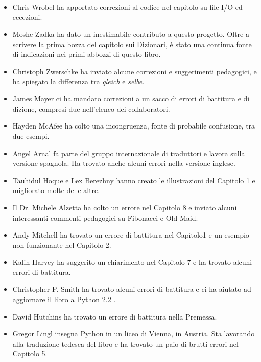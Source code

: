 \documentclass[10pt]{book}
\begin{document}
\begin{itemize}
\item Chris Wrobel ha apportato correzioni al codice nel capitolo su file I/O ed eccezioni. 

\item Moshe Zadka ha dato un inestimabile contributo a questo progetto. Oltre a scrivere la prima bozza del capitolo sui Dizionari, è stato una continua fonte di indicazioni nei primi abbozzi di questo libro.

\item Christoph Zwerschke ha inviato alcune correzioni e suggerimenti pedagogici, e ha spiegato la differenza tra {\em gleich} e {\em selbe}.

\item James Mayer ci ha mandato correzioni a un sacco di errori di battitura e di dizione, compresi due nell'elenco dei collaboratori.

\item Hayden McAfee ha colto una incongruenza, fonte di probabile confusione, tra due esempi.

\item Angel Arnal fa parte del gruppo internazionale di traduttori e lavora sulla versione spagnola. Ha trovato anche alcuni errori nella versione inglese.

\item Tauhidul Hoque e Lex Berezhny hanno creato le illustrazioni del Capitolo 1 e migliorato molte delle altre.

\item Il Dr. Michele Alzetta ha colto un errore nel Capitolo 8 e inviato alcuni interessanti commenti pedagogici su Fibonacci e Old Maid.

\item Andy Mitchell ha trovato un errore di battitura nel Capitolo1 e un esempio non funzionante nel Capitolo 2.

\item Kalin Harvey ha suggerito un chiarimento nel Capitolo 7 e ha trovato alcuni errori di battitura.

\item Christopher P. Smith ha trovato alcuni errori di battitura e ci ha aiutato ad aggiornare il libro a Python 2.2 .

\item David Hutchins ha trovato un errore di battitura nella Premessa.

\item Gregor Lingl insegna Python in un liceo di Vienna, in Austria. Sta lavorando alla traduzione tedesca del libro e ha trovato un paio di brutti errori nel Capitolo 5.


\end{itemize}
\end{document}
